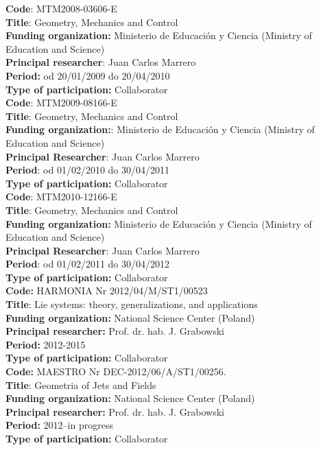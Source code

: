 \documentclass[12pt,reqno]{amsbook}
\begin{document}
\noindent
{\bf Code}: MTM2008-03606-E\\
{\bf Title}: Geometry, Mechanics and Control\\
{\bf Funding organization:} Ministerio de Educaci\'on y Ciencia (Ministry of Education and Science)\\
{\bf Principal researcher}: Juan Carlos Marrero\\
{\bf Period:} od 20/01/2009 do 20/04/2010\\
{\bf Type of participation:} Collaborator\\

\noindent
{\bf Code}: MTM2009-08166-E\\
{\bf Title}: Geometry, Mechanics and Control\\
{\bf Funding organization:}: Ministerio de Educaci\'on y Ciencia (Ministry of Education and Science)\\
{\bf Principal Researcher}: Juan Carlos Marrero\\
{\bf Period}: od 01/02/2010 do 30/04/2011\\
{\bf Type of participation:} Collaborator\\

\noindent
{\bf Code}: MTM2010-12166-E\\
{\bf Title}: Geometry, Mechanics and Control\\
{\bf Funding organization:} Ministerio de Educaci\'on y Ciencia (Ministry of Education and Science)\\
{\bf Principal Researcher}: Juan Carlos Marrero\\
{\bf Period}: od 01/02/2011 do 30/04/2012\\
{\bf Type of participation:} Collaborator\\

\noindent
{\bf Code:} HARMONIA Nr 2012/04/M/ST1/00523\\
{\bf Title}: Lie systems: theory, generalizations, and applications\\
{\bf Funding organization:} National Science Center (Poland)\\
{\bf Principal researcher:} Prof. dr. hab. J. Grabowski\\
{\bf Period:} 2012-2015\\
{\bf Type of participation:} Collaborator\\

\noindent
{\bf Code:} MAESTRO Nr DEC-2012/06/A/ST1/00256.\\
{\bf Title}: Geometria of Jets and Fields\\
{\bf Funding organization:} National Science Center (Poland)\\
{\bf Principal researcher:} Prof. dr. hab. J. Grabowski\\
{\bf Period:} 2012--in progress\\
{\bf Type of participation:} Collaborator\\
\end{document}
